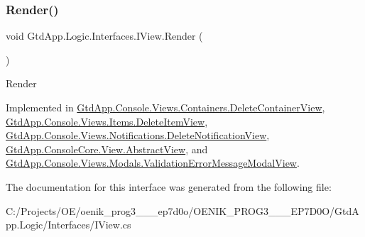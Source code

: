 \subsubsection{\texorpdfstring{Render()}{Render()}}
{\footnotesize\ttfamily void Gtd\+App.\+Logic.\+Interfaces.\+I\+View.\+Render (\begin{DoxyParamCaption}{ }\end{DoxyParamCaption})}



Render 



Implemented in \mbox{\hyperlink{class_gtd_app_1_1_console_1_1_views_1_1_containers_1_1_delete_container_view_a794e418996670c0ec9a44c21c71e1c09}{Gtd\+App.\+Console.\+Views.\+Containers.\+Delete\+Container\+View}}, \mbox{\hyperlink{class_gtd_app_1_1_console_1_1_views_1_1_items_1_1_delete_item_view_acce0bea7842b8ba472083fcfc21329f0}{Gtd\+App.\+Console.\+Views.\+Items.\+Delete\+Item\+View}}, \mbox{\hyperlink{class_gtd_app_1_1_console_1_1_views_1_1_notifications_1_1_delete_notification_view_a8398329794538274a3761116a35c9d9f}{Gtd\+App.\+Console.\+Views.\+Notifications.\+Delete\+Notification\+View}}, \mbox{\hyperlink{class_gtd_app_1_1_console_core_1_1_view_1_1_abstract_view_a1afdcb17203b5dc23d757c853a3d60bf}{Gtd\+App.\+Console\+Core.\+View.\+Abstract\+View}}, and \mbox{\hyperlink{class_gtd_app_1_1_console_1_1_views_1_1_modals_1_1_validation_error_message_modal_view_a2767ee2bc35f1897b498241d4dbf79fe}{Gtd\+App.\+Console.\+Views.\+Modals.\+Validation\+Error\+Message\+Modal\+View}}.



The documentation for this interface was generated from the following file\+:\begin{DoxyCompactItemize}
\item 
C\+:/\+Projects/\+O\+E/oenik\+\_\+prog3\+\_\+\_\+\_\+ep7d0o/\+O\+E\+N\+I\+K\+\_\+\+P\+R\+O\+G3\+\_\+\_\+\_\+\+E\+P7\+D0\+O/\+Gtd\+App.\+Logic/\+Interfaces/I\+View.\+cs\end{DoxyCompactItemize}

